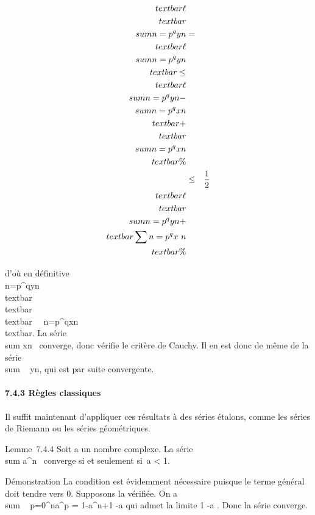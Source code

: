 \begin{align*}
\\textbar{}\ell\\textbar{}\\sum
n=p^qy n& =&
\\textbar{}\ell\\sum
n=p^qy n\\textbar{}
\leq\\textbar{} \ell\\sum
n=p^qy n -\\sum
n=p^qx n\\textbar{}
+\\textbar{} \\sum
n=p^qx n\\textbar{}\%&
\\ & \leq& 1 \over 2
\\textbar{}\ell\\textbar{}\\sum
n=p^qy n +\\textbar{}
\sum n=p^qx~
n\\textbar{} \%& \\
\end{align*}

d'où en définitive \\\sum
 n=p^qyn  \over
\\textbar{}\ell\\textbar{}
\\textbar{}\
\sum ~
n=p^qxn\\textbar{}. La série
\\sum  xn~
converge, donc vérifie le critère de Cauchy. Il en est donc de même de
la série \\sum ~
yn, qui est par suite convergente.

\paragraph{7.4.3 Règles classiques}

Il suffit maintenant d'appliquer ces résultats à des séries étalons,
comme les séries de Riemann ou les séries géométriques.

Lemme~7.4.4 Soit a un nombre complexe. La série
\\sum  a^n~
converge si et seulement si~\textbar{}a\textbar{} \textless{} 1.

Démonstration La condition est évidemment nécessaire puisque le terme
général doit tendre vers 0. Supposons la vérifiée. On a
\\sum ~
p=0^na^p = 1-a^n+1
-a qui admet la limite  1 \over
1-a . Donc la série converge.

